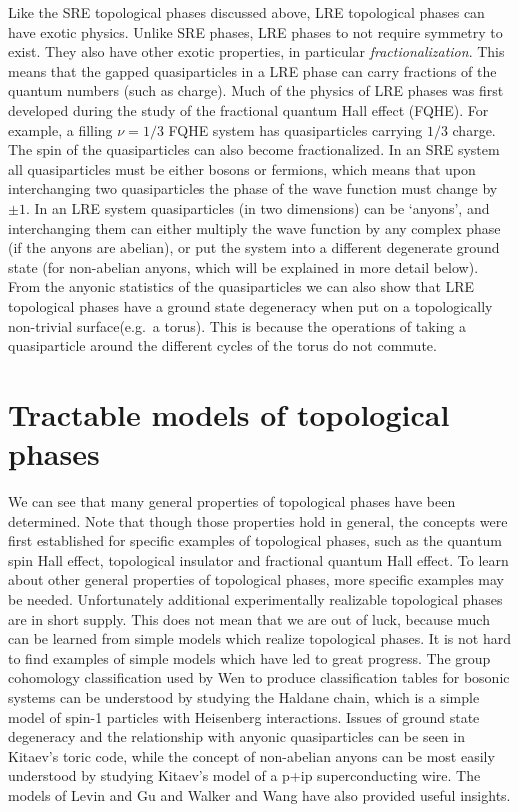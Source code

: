 Like the SRE topological phases discussed above, LRE topological phases can have exotic physics. Unlike SRE phases, LRE phases to not require symmetry to exist. They also have other exotic properties, in particular \emph{fractionalization}. This means that the gapped quasiparticles in a LRE phase can carry fractions of the quantum numbers (such as charge). Much of the physics of LRE phases was first developed during the study of the fractional quantum Hall effect (FQHE). For example, a filling $\nu=1/3$ FQHE system has quasiparticles carrying $1/3$ charge. The spin of the quasiparticles can also become fractionalized. In an SRE system all quasiparticles must be either bosons or fermions, which means that upon interchanging two quasiparticles the phase of the wave function must change by $\pm 1$. In an LRE system quasiparticles (in two dimensions) can be `anyons', and interchanging them can either multiply the wave function by any complex phase (if the anyons are abelian), or put the system into a different degenerate ground state (for non-abelian anyons, which will be explained in more detail below). 
From the anyonic statistics of the quasiparticles we can also show that LRE topological phases have a ground state degeneracy when put on a topologically non-trivial surface(e.g.~a torus). This is because the operations of taking a quasiparticle around the different cycles of the torus do not commute.

\section{Tractable models of topological phases}

	We can see that many general properties of topological phases have been determined. Note that though those properties hold in general, the concepts were first established for specific examples of topological phases, such as the quantum spin Hall effect, topological insulator and fractional quantum Hall effect. To learn about other general properties of topological phases, more specific examples may be needed. Unfortunately additional experimentally realizable topological phases are in short supply. This does not mean that we are out of luck, because much can be learned from simple models which realize topological phases. It is not hard to find examples of simple models which have led to great progress. The group cohomology classification used by Wen to produce classification tables for bosonic systems\cite{WenScience,WenPRB} can be understood by studying the Haldane chain, which is a simple model of spin-1 particles with Heisenberg interactions. Issues of ground state degeneracy and the relationship with anyonic quasiparticles can be seen in Kitaev's toric code\cite{KitaevToric}, while the concept of non-abelian anyons can be most easily understood by studying Kitaev's model of a p+ip superconducting wire. The models of Levin and Gu\cite{LevinGu2012} and Walker and Wang\cite{WalkerWang,KeyserlingkBurnell2014} have also provided useful insights.

